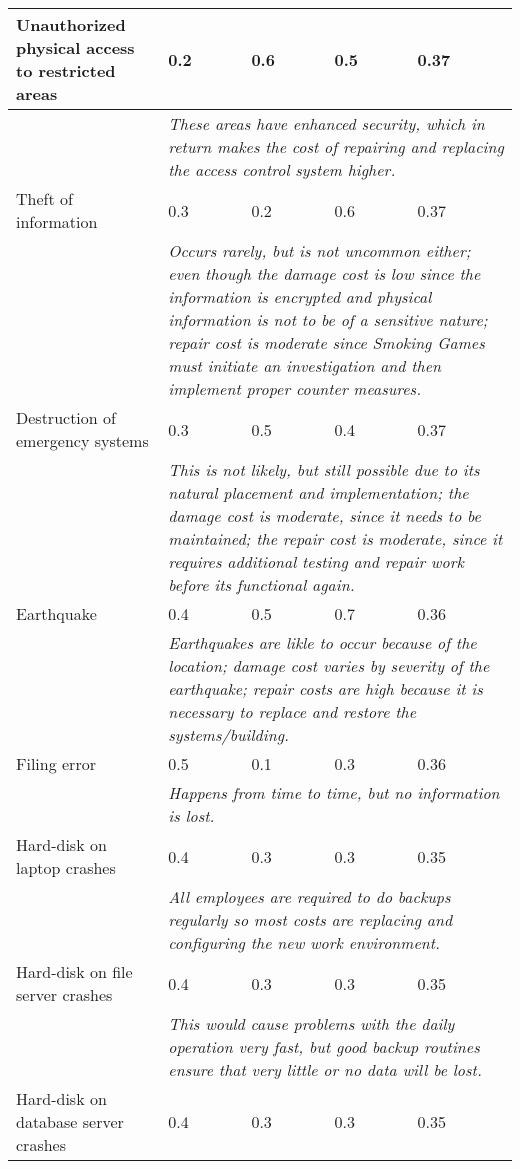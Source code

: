 \begin{longtable}{| p{4.2cm} | p{1.8cm} | p{1.8cm} | p{1.8cm} | p{1.8cm} |}
		Unauthorized physical access to restricted areas & 0.2 & 0.6 & 0.5 & 0.37\\\hline
		& \multicolumn{4}{|p{8cm}|}{\textit{These areas have enhanced security, which in return makes the cost of repairing and replacing the access control system higher.}}\\\hline
		Theft of information & 0.3 & 0.2 & 0.6 & 0.37\\\hline
		& \multicolumn{4}{|p{8cm}|}{\textit{Occurs rarely, but is not uncommon either; even though the damage cost is low since the information is encrypted and physical information is not to be of a sensitive nature; repair cost is moderate since Smoking Games must initiate an investigation and then implement proper counter measures.}}\\\hline
		Destruction of emergency systems & 0.3 & 0.5 & 0.4 & 0.37\\\hline
		& \multicolumn{4}{|p{8cm}|}{\textit{This is not likely, but still possible due to its natural placement and implementation; the damage cost is moderate, since it needs to be maintained; the repair cost is moderate, since it requires additional testing and repair work before its functional again.}}\\\hline
		Earthquake & 0.4 & 0.5 & 0.7 & 0.36\\\hline
		& \multicolumn{4}{|p{8cm}|}{\textit{Earthquakes are likle to occur because of the location; damage cost varies by severity of the earthquake; repair costs are high because it is necessary to replace and restore the systems/building.}}\\\hline
		Filing error & 0.5 & 0.1 & 0.3 & 0.36\\\hline
		& \multicolumn{4}{|p{8cm}|}{\textit{Happens from time to time, but no information is lost.}}\\\hline
		Hard-disk on laptop crashes & 0.4 & 0.3 & 0.3 & 0.35\\\hline
		& \multicolumn{4}{|p{8cm}|}{\textit{All employees are required to do backups regularly so most costs are replacing and configuring the new work environment.}}\\\hline
		Hard-disk on file server crashes & 0.4 & 0.3 & 0.3 & 0.35\\\hline
		& \multicolumn{4}{|p{8cm}|}{\textit{This would cause problems with the daily operation very fast, but good backup routines ensure that very little or no data will be lost.}}\\\hline
		Hard-disk on database server crashes & 0.4 & 0.3 & 0.3 & 0.35\\\hline

\end{longtable}
